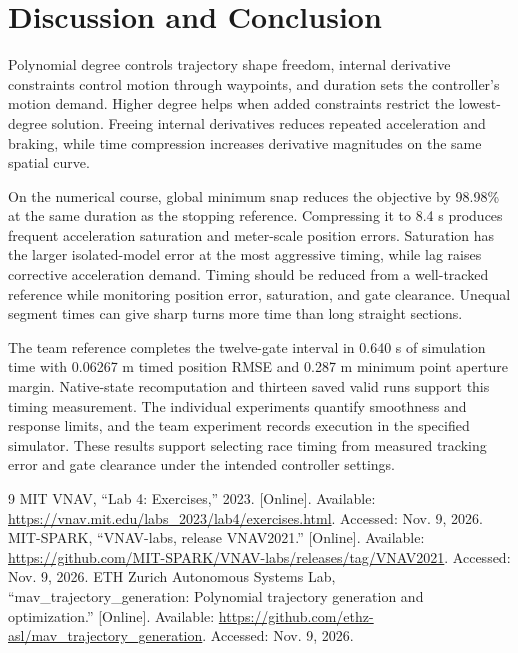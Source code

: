 \documentclass[letterpaper,10pt,conference]{ieeeconf}
\begin{document}
\section{Discussion and Conclusion}
Polynomial degree controls trajectory shape freedom, internal derivative constraints control motion through waypoints, and duration sets the controller's motion demand.
Higher degree helps when added constraints restrict the lowest-degree solution.
Freeing internal derivatives reduces repeated acceleration and braking, while time compression increases derivative magnitudes on the same spatial curve.

On the numerical course, global minimum snap reduces the objective by 98.98\% at the same duration as the stopping reference.
Compressing it to 8.4 s produces frequent acceleration saturation and meter-scale position errors.
Saturation has the larger isolated-model error at the most aggressive timing, while lag raises corrective acceleration demand.
Timing should be reduced from a well-tracked reference while monitoring position error, saturation, and gate clearance.
Unequal segment times can give sharp turns more time than long straight sections.

The team reference completes the twelve-gate interval in 0.640 s of simulation time with 0.06267 m timed position RMSE and 0.287 m minimum point aperture margin.
Native-state recomputation and thirteen saved valid runs support this timing measurement.
The individual experiments quantify smoothness and response limits, and the team experiment records execution in the specified simulator.
These results support selecting race timing from measured tracking error and gate clearance under the intended controller settings.
\begin{thebibliography}{9}
 MIT VNAV, ``Lab 4: Exercises,'' 2023. [Online]. Available: \url{https://vnav.mit.edu/labs_2023/lab4/exercises.html}. Accessed: Nov. 9, 2026.
 MIT-SPARK, ``VNAV-labs, release VNAV2021.'' [Online]. Available: \url{https://github.com/MIT-SPARK/VNAV-labs/releases/tag/VNAV2021}. Accessed: Nov. 9, 2026.
 ETH Zurich Autonomous Systems Lab, ``mav\_trajectory\_generation: Polynomial trajectory generation and optimization.'' [Online]. Available: \url{https://github.com/ethz-asl/mav_trajectory_generation}. Accessed: Nov. 9, 2026.
\end{thebibliography}
\end{document}
